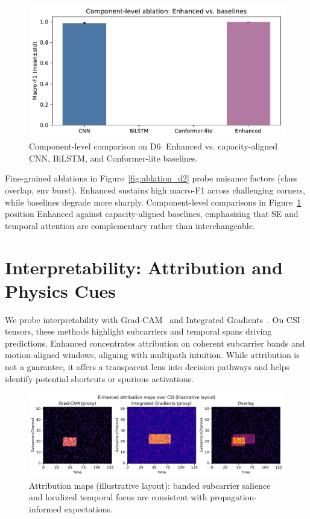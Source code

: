 \documentclass[journal]{IEEEtran}
\begin{document}
\begin{figure}[t]
\centering
\includegraphics[width=\columnwidth]{plots/ablation_components.pdf}
\caption{Component-level comparison on D6: Enhanced vs. capacity-aligned CNN, BiLSTM, and Conformer-lite baselines.}
\label{fig:ablation_components}
\end{figure}

Fine-grained ablations in Figure~\ref{fig:ablation_d2} probe nuisance factors (class overlap, env burst). Enhanced sustains high macro-F1 across challenging corners, while baselines degrade more sharply. Component-level comparisons in Figure~\ref{fig:ablation_components} position Enhanced against capacity-aligned baselines, emphasizing that SE and temporal attention are complementary rather than interchangeable.

\section{Interpretability: Attribution and Physics Cues}
We probe interpretability with Grad-CAM~\cite{selvaraju2017gradcam} and Integrated Gradients~\cite{sundararajan2017ig}. On CSI tensors, these methods highlight subcarriers and temporal spans driving predictions. Enhanced concentrates attribution on coherent subcarrier bands and motion-aligned windows, aligning with multipath intuition. While attribution is not a guarantee, it offers a transparent lens into decision pathways and helps identify potential shortcuts or spurious activations.

\begin{figure}[t]
\centering
\includegraphics[width=\columnwidth]{plots/attribution_examples.pdf}
\caption{Attribution maps (illustrative layout): banded subcarrier salience and localized temporal focus are consistent with propagation-informed expectations.}
\label{fig:attribution}
\end{figure}
\end{document}
